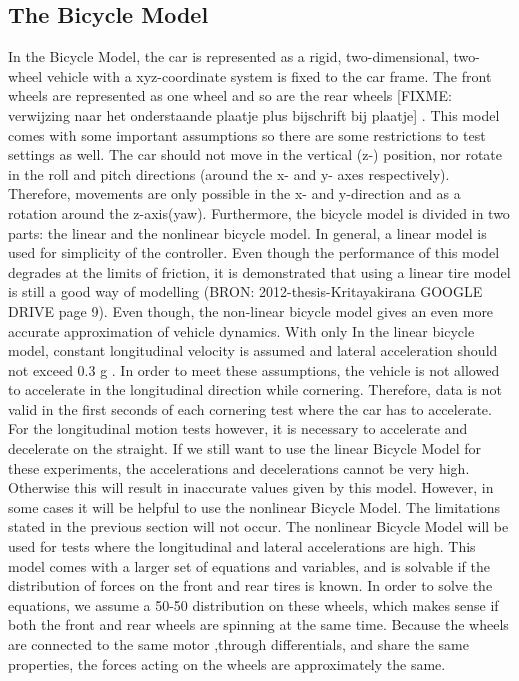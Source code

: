 \subsection{The Bicycle Model}
In the Bicycle Model, the car is represented as a rigid, two-dimensional, two-wheel vehicle with a xyz-coordinate system is fixed to the car frame. The front wheels are represented as one wheel and so are the rear wheels [FIXME: verwijzing naar het onderstaande plaatje plus bijschrift bij plaatje] . This model comes with some important assumptions so there are some restrictions to test settings as well. The car should not move in the vertical (z-) position, nor rotate in the roll and pitch directions (around the x- and y- axes respectively). Therefore, movements are only possible in the x- and y-direction and as a rotation around the z-axis(yaw). 
Furthermore, the bicycle model is divided in two parts: the linear and the nonlinear bicycle model. In general, a linear model is used for simplicity of the controller. Even though the performance of this model degrades at the limits of friction, it is demonstrated that using a linear tire model is still a good way of modelling (BRON: 2012-thesis-Kritayakirana GOOGLE DRIVE page 9). Even though, the non-linear bicycle model gives an even more accurate approximation of vehicle dynamics. With only 
In the linear bicycle model, constant longitudinal velocity is assumed and lateral acceleration should not exceed 0.3 g . In order to meet these assumptions, the vehicle is not allowed to accelerate in the longitudinal direction while cornering. Therefore, data is not valid in the first seconds of each cornering test where the car has to accelerate. For the longitudinal motion tests however, it is necessary to accelerate and decelerate on the straight. If we still want to use the linear Bicycle Model for these experiments, the accelerations and decelerations cannot be very high. Otherwise this will result in inaccurate values given by this model.
	However, in some cases it will be helpful to use the nonlinear Bicycle Model. The limitations stated in the previous section will not occur. The nonlinear Bicycle Model will be used for tests where the longitudinal and lateral accelerations are high. This model comes with a larger set of equations and variables, and is solvable if the distribution of forces on the front and rear tires is known. In order to solve the equations, we assume a 50-50 distribution on these wheels, which makes sense if both the front and rear wheels are spinning at the same time. Because the wheels are connected to the same motor ,through differentials, and share the same properties, the forces acting on the wheels are approximately the same. 
	
